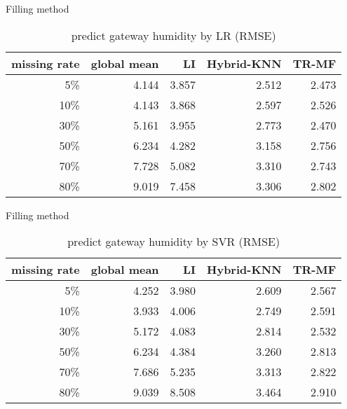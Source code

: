 \begin{table} [htbp]
\setlength{\tabcolsep}{2pt}
\centering
\caption{predict gateway humidity by LR (RMSE) }
\label{table: LR}
   Filling method
\begin{tabular}{ r | r r r r}
        missing rate&global mean     &LI   &Hybrid-KNN &TR-MF\\ \hline
        5\%      &4.144&3.857&2.512&2.473\\
        10\%    &4.143&3.868& 2.597&2.526\\
        30\%    &5.161&3.955&2.773&2.470\\
        50\%    &6.234&4.282&3.158&2.756\\
        70\%   &7.728&5.082&3.310&2.743\\
        80\%   &9.019&7.458&3.306&2.802\\
\end{tabular}
\end{table}

\begin{table}[htbp]
\setlength{\tabcolsep}{2pt}
\centering
\caption{predict gateway humidity by SVR (RMSE) }
\label{table: SVR}
   Filling method
\begin{tabular}{ r | r r r r}
        missing rate&global mean     &LI   &Hybrid-KNN &TR-MF\\ \hline
        5\%&4.252&3.980&2.609&2.567\\
        10\%    &3.933 &4.006&2.749&2.591\\
        30\%    &5.172&4.083&2.814&2.532\\
        50\%    &6.234&4.384&3.260&2.813\\
        70\%   &7.686&5.235&3.313&2.822\\
        80\%  &9.039&8.508&3.464&2.910\\
\end{tabular}
\end{table}
